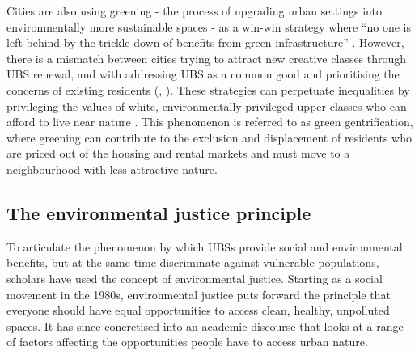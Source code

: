 \documentclass{article}
\begin{document}
Cities are also using greening - the process of upgrading urban settings into environmentally more sustainable spaces - as a win-win strategy where ``no one is left behind by the trickle-down of benefits from green infrastructure'' \parencite{anguelovski2021green}. However, there is a mismatch between cities trying to attract new creative classes through UBS renewal, and with addressing UBS as a common good and prioritising the concerns of existing residents (\cite{wessells2014urban}, \cite{anguelovski2020expanding}).
These strategies can perpetuate inequalities by privileging the values of white, environmentally privileged upper classes who can afford to live near nature \parencite{anguelovski2021green}. This phenomenon is referred to as green gentrification, where greening can contribute to the exclusion and displacement of residents who are priced out of the housing and rental markets and must move to a neighbourhood with less attractive nature.

\subsection{The environmental justice principle}

To articulate the phenomenon by which UBSs provide social and environmental benefits, but at the same time discriminate against vulnerable populations, scholars have used the concept of environmental justice.
Starting as a social movement in the 1980s, environmental justice puts forward the principle that everyone should have equal opportunities to access clean, healthy, unpolluted spaces. It has since concretised into an academic discourse that looks at a range of factors affecting the opportunities people have to access urban nature. 



\end{document}
